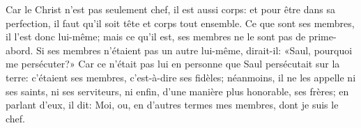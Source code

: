 Car le Christ n’est pas seulement chef, il est aussi corps:
	et pour être dans sa perfection,
	il faut qu’il soit tête et corps tout ensemble.
Ce que sont ses membres, il l’est donc lui-même;
	mais ce qu’il est, ses membres ne le sont pas de prime-abord.
Si ses membres n’étaient pas un autre lui-même, dirait-il:
	«Saul, pourquoi me persécuter?»
Car ce n’était pas lui en personne que Saul persécutait sur la terre:
	c’étaient ses membres, c’est-à-dire ses fidèles;
	néanmoins, il ne les appelle ni ses saints, ni ses serviteurs,
	ni enfin, d’une manière plus honorable, ses frères;
	en parlant d’eux, il dit: Moi,
	ou, en d’autres termes mes membres, dont je suis le chef.
